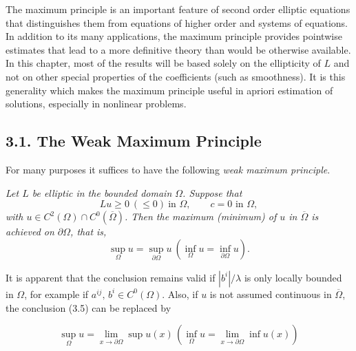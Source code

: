 
The maximum principle is an important feature of second order elliptic equations that distinguishes them from equations of higher order and systems of equations. In addition to its many applications, the maximum principle provides pointwise estimates that lead to a more definitive theory than would be otherwise available. In this chapter, most of the results will be based solely on the ellipticity of $L$ and not on other special properties of the coefficients (such as smoothness). It is this generality which makes the maximum principle useful in apriori estimation of solutions, especially in nonlinear problems.

\subsection*{3.1. The Weak Maximum Principle}

For many purposes it suffices to have the following \emph{weak maximum principle}.

\begin{theorem}\label{gt-ch3-wmp}
\emph{Let $L$ be elliptic in the bounded domain $\Omega$. Suppose that}
\begin{equation}
Lu \ge 0 \ (\le 0) \ \text{in } \Omega, \qquad c = 0 \text{ in } \Omega,
\tag{3.4}
\end{equation}
\emph{with $u \in C^2(\Omega) \cap C^0(\overline{\Omega})$. Then the maximum (minimum) of $u$ in $\overline{\Omega}$ is achieved on $\partial\Omega$, that is,}
\begin{equation}
\sup_{\Omega} u = \sup_{\partial\Omega} u \ (\inf_{\Omega} u = \inf_{\partial\Omega} u).
\tag{3.5}
\end{equation}
\end{theorem}

It is apparent that the conclusion remains valid if $|b^i|/\lambda$ is only locally bounded in $\Omega$, for example if $a^{ij},\, b^i \in C^0(\Omega)$. Also, if $u$ is not assumed continuous in $\overline{\Omega}$, the conclusion (3.5) can be replaced by

\begin{equation}
\sup_{\Omega} u = \lim_{x \to \partial\Omega} \sup u(x) \, (\inf_{\Omega} u = \lim_{x \to \partial\Omega} \inf u(x))
\tag{3.6}
\end{equation}

